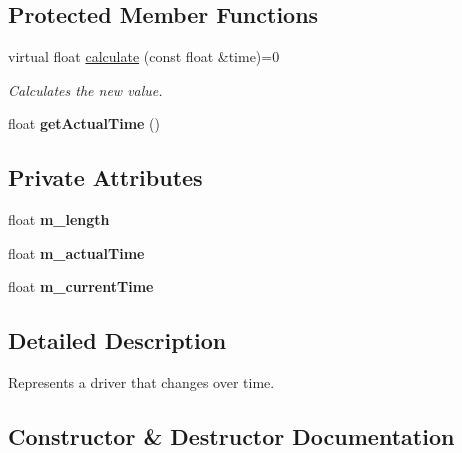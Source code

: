 \subsection*{Protected Member Functions}
\begin{DoxyCompactItemize}
\item 
virtual float \hyperlink{classflounder_1_1idriver_a034c4159dc98c4c37ffdfaae64e4a16d}{calculate} (const float \&time)=0
\begin{DoxyCompactList}\small\item\em Calculates the new value. \end{DoxyCompactList}\item 
\mbox{\label{classflounder_1_1idriver_a1b295944b61ae4ec6f312f842549294e}} 
float {\bfseries get\+Actual\+Time} ()
\end{DoxyCompactItemize}
\subsection*{Private Attributes}
\begin{DoxyCompactItemize}
\item 
\mbox{\label{classflounder_1_1idriver_a24b0f7c3245fccec35c7bd8475501227}} 
float {\bfseries m\+\_\+length}
\item 
\mbox{\label{classflounder_1_1idriver_a323a95dedeb8e0a2c6e4a0e62268799f}} 
float {\bfseries m\+\_\+actual\+Time}
\item 
\mbox{\label{classflounder_1_1idriver_a8b16f2ff43ceb60aeaf74dc0f137a829}} 
float {\bfseries m\+\_\+current\+Time}
\end{DoxyCompactItemize}


\subsection{Detailed Description}
Represents a driver that changes over time. 



\subsection{Constructor \& Destructor Documentation}
\mbox{\label{classflounder_1_1idriver_a84bafd01e3984ededbb170a5efbad0f0}} 
